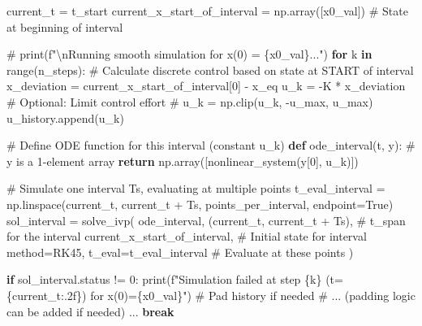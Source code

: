 \documentclass[
  letterpaper,
  DIV=11,
  numbers=noendperiod,
  oneside]{scrartcl}
\newenvironment{Shaded}{\begin{snugshade}}{\end{snugshade}}
\newcommand{\BuiltInTok}[1]{\textcolor[rgb]{0.00,0.23,0.31}{#1}}
\newcommand{\CommentTok}[1]{\textcolor[rgb]{0.37,0.37,0.37}{#1}}
\newcommand{\ControlFlowTok}[1]{\textcolor[rgb]{0.00,0.23,0.31}{\textbf{#1}}}
\newcommand{\DecValTok}[1]{\textcolor[rgb]{0.68,0.00,0.00}{#1}}
\newcommand{\KeywordTok}[1]{\textcolor[rgb]{0.00,0.23,0.31}{\textbf{#1}}}
\newcommand{\NormalTok}[1]{\textcolor[rgb]{0.00,0.23,0.31}{#1}}
\newcommand{\OperatorTok}[1]{\textcolor[rgb]{0.37,0.37,0.37}{#1}}
\newcommand{\SpecialCharTok}[1]{\textcolor[rgb]{0.37,0.37,0.37}{#1}}
\newcommand{\SpecialStringTok}[1]{\textcolor[rgb]{0.13,0.47,0.30}{#1}}
\newcommand{\StringTok}[1]{\textcolor[rgb]{0.13,0.47,0.30}{#1}}
\newcommand{\VariableTok}[1]{\textcolor[rgb]{0.07,0.07,0.07}{#1}}
\begin{document}
\begin{Shaded}
\begin{Highlighting}[numbers=left,,]
\NormalTok{    current\_t }\OperatorTok{=}\NormalTok{ t\_start}
\NormalTok{    current\_x\_start\_of\_interval }\OperatorTok{=}\NormalTok{ np.array([x0\_val]) }\CommentTok{\# State at beginning of interval}

    \CommentTok{\# print(f"\textbackslash{}nRunning smooth simulation for x(0) = \{x0\_val\}...")}
    \ControlFlowTok{for}\NormalTok{ k }\KeywordTok{in} \BuiltInTok{range}\NormalTok{(n\_steps):}
        \CommentTok{\# Calculate discrete control based on state at START of interval}
\NormalTok{        x\_deviation }\OperatorTok{=}\NormalTok{ current\_x\_start\_of\_interval[}\DecValTok{0}\NormalTok{] }\OperatorTok{{-}}\NormalTok{ x\_eq}
\NormalTok{        u\_k }\OperatorTok{=} \OperatorTok{{-}}\NormalTok{K }\OperatorTok{*}\NormalTok{ x\_deviation}
        \CommentTok{\# Optional: Limit control effort}
        \CommentTok{\# u\_k = np.clip(u\_k, {-}u\_max, u\_max)}
\NormalTok{        u\_history.append(u\_k)}

        \CommentTok{\# Define ODE function for this interval (constant u\_k)}
        \KeywordTok{def}\NormalTok{ ode\_interval(t, y): }\CommentTok{\# y is a 1{-}element array}
            \ControlFlowTok{return}\NormalTok{ np.array([nonlinear\_system(y[}\DecValTok{0}\NormalTok{], u\_k)])}

        \CommentTok{\# Simulate one interval Ts, evaluating at multiple points}
\NormalTok{        t\_eval\_interval }\OperatorTok{=}\NormalTok{ np.linspace(current\_t, current\_t }\OperatorTok{+}\NormalTok{ Ts, points\_per\_interval, endpoint}\OperatorTok{=}\VariableTok{True}\NormalTok{)}
\NormalTok{        sol\_interval }\OperatorTok{=}\NormalTok{ solve\_ivp(}
\NormalTok{            ode\_interval,}
\NormalTok{            (current\_t, current\_t }\OperatorTok{+}\NormalTok{ Ts), }\CommentTok{\# t\_span for the interval}
\NormalTok{            current\_x\_start\_of\_interval, }\CommentTok{\# Initial state for interval}
\NormalTok{            method}\OperatorTok{=}\StringTok{\textquotesingle{}RK45\textquotesingle{}}\NormalTok{,}
\NormalTok{            t\_eval}\OperatorTok{=}\NormalTok{t\_eval\_interval }\CommentTok{\# Evaluate at these points}
\NormalTok{        )}

        \ControlFlowTok{if}\NormalTok{ sol\_interval.status }\OperatorTok{!=} \DecValTok{0}\NormalTok{:}
            \BuiltInTok{print}\NormalTok{(}\SpecialStringTok{f"Simulation failed at step }\SpecialCharTok{\{}\NormalTok{k}\SpecialCharTok{\}}\SpecialStringTok{ (t=}\SpecialCharTok{\{}\NormalTok{current\_t}\SpecialCharTok{:.2f\}}\SpecialStringTok{) for x(0)=}\SpecialCharTok{\{}\NormalTok{x0\_val}\SpecialCharTok{\}}\SpecialStringTok{"}\NormalTok{)}
            \CommentTok{\# Pad history if needed}
            \CommentTok{\# ... (padding logic can be added if needed) ...}
            \ControlFlowTok{break}


\end{Highlighting}
\end{Shaded}
\end{document}
